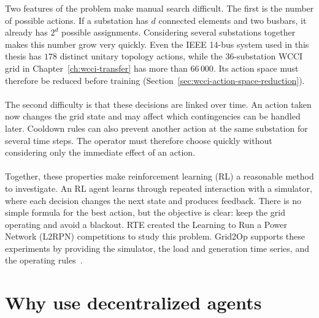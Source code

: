 Two features of the problem make manual search difficult. The first is the
number of possible actions. If a substation has $d$ connected elements and two
busbars, it already has $2^{d}$ possible assignments. Considering several
substations together makes this number grow very quickly. Even the IEEE 14-bus
system used in this thesis has $178$ distinct unitary topology actions, while
the 36-substation WCCI grid in Chapter~\ref{ch:wcci-transfer} has more than
$66\,000$. Its action space must therefore be reduced before training
(Section~\ref{sec:wcci-action-space-reduction}).
\\
\\
The second difficulty is that these decisions are linked over time. An action
taken now changes the grid state and may affect which contingencies can be
handled later. Cooldown rules can also prevent another action at the same
substation for several time steps. The operator must therefore choose quickly
without considering only the immediate effect of an action.
\\
\\
Together, these properties make reinforcement learning (RL) a reasonable method
to investigate. An RL agent learns through repeated interaction with a
simulator, where each decision changes the next state and produces feedback.
There is no simple formula for the best action, but the objective is clear: keep
the grid operating and avoid a blackout. RTE created the Learning to Run a
Power Network (L2RPN) competitions to study this problem. Grid2Op supports these
experiments by providing the simulator, the load and generation time series,
and the operating rules~\cite{donnot2020grid2op,marot2021l2rpn}.

\section{Why use decentralized agents}
\label{sec:intro-decentralized}

